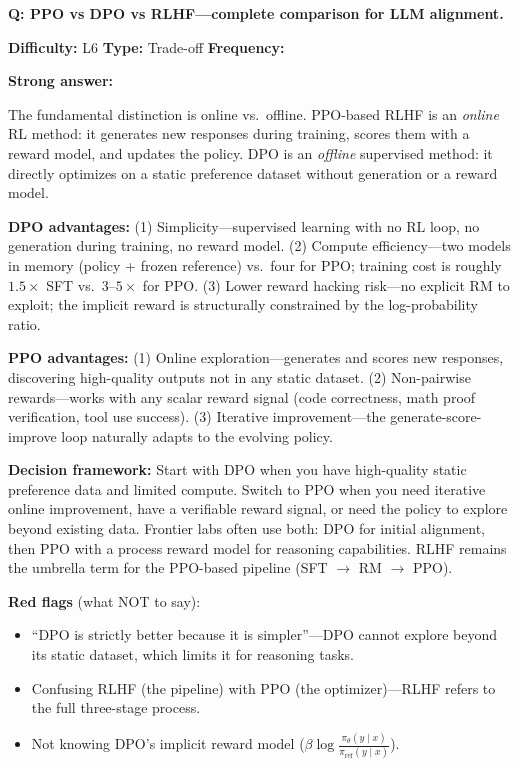 \begin{interviewq}
\textbf{Q: PPO vs DPO vs RLHF---complete comparison for LLM alignment.}

\textbf{Difficulty:} L6 \quad \textbf{Type:} Trade-off \quad \textbf{Frequency:} \freqhigh{}

\textbf{Strong answer:}

The fundamental distinction is online vs.\ offline. PPO-based RLHF is an \textit{online} RL method: it generates new responses during training, scores them with a reward model, and updates the policy. DPO is an \textit{offline} supervised method: it directly optimizes on a static preference dataset without generation or a reward model.

\textbf{DPO advantages:} (1) Simplicity---supervised learning with no RL loop, no generation during training, no reward model. (2) Compute efficiency---two models in memory (policy + frozen reference) vs.\ four for PPO; training cost is roughly $1.5\times$ SFT vs.\ $3$--$5\times$ for PPO. (3) Lower reward hacking risk---no explicit RM to exploit; the implicit reward is structurally constrained by the log-probability ratio.

\textbf{PPO advantages:} (1) Online exploration---generates and scores new responses, discovering high-quality outputs not in any static dataset. (2) Non-pairwise rewards---works with any scalar reward signal (code correctness, math proof verification, tool use success). (3) Iterative improvement---the generate-score-improve loop naturally adapts to the evolving policy.

\textbf{Decision framework:} Start with DPO when you have high-quality static preference data and limited compute. Switch to PPO when you need iterative online improvement, have a verifiable reward signal, or need the policy to explore beyond existing data. Frontier labs often use both: DPO for initial alignment, then PPO with a process reward model for reasoning capabilities. RLHF remains the umbrella term for the PPO-based pipeline (SFT $\rightarrow$ RM $\rightarrow$ PPO).

\textbf{Red flags} (what NOT to say):
\begin{itemize}
    \item ``DPO is strictly better because it is simpler''---DPO cannot explore beyond its static dataset, which limits it for reasoning tasks.
    \item Confusing RLHF (the pipeline) with PPO (the optimizer)---RLHF refers to the full three-stage process.
    \item Not knowing DPO's implicit reward model ($\beta \log \frac{\pi_\theta(y \mid x)}{\pi_{\text{ref}}(y \mid x)}$).
\end{itemize}


\end{interviewq}
